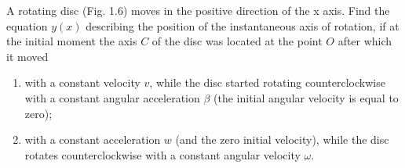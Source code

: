 
\item A rotating disc (Fig. 1.6) moves in the positive direction of the x axis. Find the equation \( y(x) \) describing the position of the instantaneous axis of rotation, if at the initial moment the axis \( C \) of the disc was located at the point \( O \) after which it moved
    \begin{enumerate}
        \item with a constant velocity \( v \), while the disc started rotating counterclockwise with a constant angular acceleration \( \beta \) (the initial angular velocity is equal to zero);
    
        \item with a constant acceleration \( w \) (and the zero initial velocity), while the disc rotates counterclockwise with a constant angular velocity \( \omega \).
    \end{enumerate}

